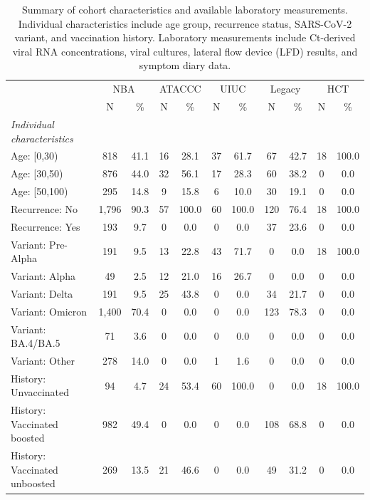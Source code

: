 \documentclass[12pt]{article}
\begin{document}
\begin{landscape}
\begin{table}[p]
    \centering
    \caption{Summary of cohort characteristics and available laboratory measurements. Individual characteristics include age group, recurrence status, SARS-CoV-2 variant, and vaccination history. Laboratory measurements include Ct-derived viral RNA concentrations, viral cultures, lateral flow device (LFD) results, and symptom diary data.}
    \small
    \begin{tabular}{lcccccccccc}
     \toprule
     & \multicolumn{2}{c}{NBA} & \multicolumn{2}{c}{ATACCC} & \multicolumn{2}{c}{UIUC} & \multicolumn{2}{c}{Legacy} & \multicolumn{2}{c}{HCT} \\
      & N & \%& N & \% & N & \% & N & \% & N & \% \\
     \midrule
     \textit{Individual characteristics} &  &  &  &  &  &  &  &  &  &  \\
     Age: [0,30) & 818 & 41.1 & 16 & 28.1 & 37 & 61.7 & 67 & 42.7 & 18 & 100.0 \\
     Age: [30,50) & 876 & 44.0 & 32 & 56.1 & 17 & 28.3 & 60 & 38.2 & 0 & 0.0 \\
     Age: [50,100) & 295 & 14.8 & 9 & 15.8 & 6 & 10.0 & 30 & 19.1 & 0 & 0.0 \\
     Recurrence: No & 1,796 & 90.3 & 57 & 100.0 & 60 & 100.0 & 120 & 76.4 & 18 & 100.0 \\
     Recurrence: Yes & 193 & 9.7 & 0 & 0.0 & 0 & 0.0 & 37 & 23.6 & 0 & 0.0 \\
     Variant: Pre-Alpha & 191 & 9.5 & 13 & 22.8 & 43 & 71.7 & 0 & 0.0 & 18 & 100.0 \\
     Variant: Alpha & 49 & 2.5 & 12 & 21.0 & 16 & 26.7 & 0 & 0.0 & 0 & 0.0 \\
     Variant: Delta & 191 & 9.5 & 25 & 43.8 & 0 & 0.0 & 34 & 21.7 & 0 & 0.0 \\
     Variant: Omicron & 1,400 & 70.4 & 0 & 0.0 & 0 & 0.0 & 123 & 78.3 & 0 & 0.0 \\
     Variant: BA.4/BA.5 & 71 & 3.6 & 0 & 0.0 & 0 & 0.0 & 0 & 0.0 & 0 & 0.0 \\
     Variant: Other & 278 & 14.0 & 0 & 0.0 & 1 & 1.6 & 0 & 0.0 & 0 & 0.0\\
     History: Unvaccinated & 94 & 4.7 & 24 & 53.4 & 60 & 100.0 & 0 & 0.0 & 18 & 100.0 \\
     History: Vaccinated boosted & 982 & 49.4 & 0 & 0.0 & 0 & 0.0 & 108 & 68.8 & 0 & 0.0 \\
     History: Vaccinated unboosted & 269 & 13.5 & 21 & 46.6 & 0 & 0.0 & 49 & 31.2 & 0 & 0.0\\

\end{tabular}
\end{table}
\end{landscape}
\end{document}
